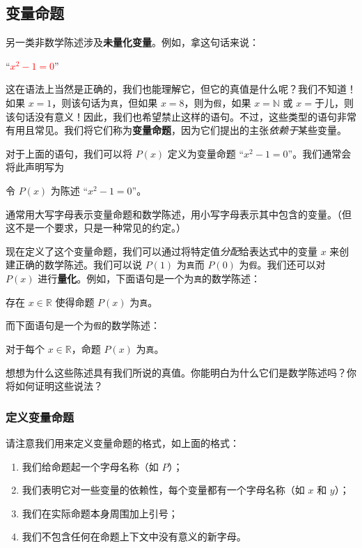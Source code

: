 \subsection{变量命题}

另一类非数学陈述涉及\textbf{未量化变量}。例如，拿这句话来说：
\begin{center}
    ``\textcolor{red}{$x^2 - 1 = 0$}''
\end{center}
这在语法上当然是正确的，我们也能理解它，但它的真值是什么呢？我们不知道！如果 $x = 1$，则该句话为\verb|真|，但如果 $x = 8$，则为\verb|假|，如果 $x = \mathbb{N}$ 或 $x = \text{于儿}$，则该句话没有意义！因此，我们也希望禁止这样的语句。不过，这些类型的语句非常有用且常见。我们将它们称为\textbf{变量命题}，因为它们提出的主张\emph{依赖于}某些变量。

对于上面的语句，我们可以将 $P(x)$ 定义为变量命题 ``$x^2 - 1 = 0$''。我们通常会将此声明写为
\begin{center}
    \textcolor{olivegreen}{令 $P(x)$ 为陈述 ``$x^2 - 1 = 0$''。}
\end{center}
通常用大写字母表示变量命题和数学陈述，用小写字母表示其中包含的变量。（但这不是一个要求，只是一种常见的约定。）

现在定义了这个变量命题，我们可以通过将特定值\emph{分配}给表达式中的变量 $x$ 来创建正确的数学陈述。我们可以说 $P(1)$ 为\verb|真|而 $P(0)$ 为\verb|假|。我们还可以对 $P(x)$ 进行\textbf{量化}。例如，下面语句是一个为\verb|真|的数学陈述：
\begin{center}
    存在 $x \in \mathbb{R}$ 使得命题 $P(x)$ 为\verb|真|。
\end{center}
而下面语句是一个为\verb|假|的数学陈述：
\begin{center}
    对于每个 $x \in \mathbb{R}$，命题 $P(x)$ 为\verb|真|。
\end{center}
想想为什么这些陈述具有我们所说的真值。你能明白为什么它们是数学陈述吗？你将如何证明这些说法？

\subsubsection*{定义变量命题}

请注意我们用来定义变量命题的格式，如上面的格式：
\begin{enumerate}[label=(\arabic*)]
    \item 我们给命题起一个字母名称（如 $P$）；
    \item 我们表明它对一些变量的依赖性，每个变量都有一个字母名称（如 $x$ 和 $y$）；
    \item 我们在实际命题本身周围加上引号；
    \item 我们不包含任何在命题上下文中没有意义的新字母。
\end{enumerate}

